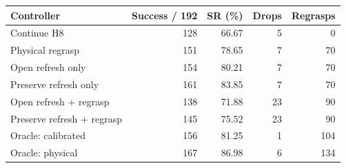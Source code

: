 \begin{tabular}{lrrrr}
\toprule
Controller & Success / 192 & SR (\%) & Drops & Regrasps \\
\midrule
Continue H8 & 128 & 66.67 & 5 & 0 \\
Physical regrasp & 151 & 78.65 & 7 & 70 \\
Open refresh only & 154 & 80.21 & 7 & 70 \\
Preserve refresh only & 161 & 83.85 & 7 & 70 \\
Open refresh + regrasp & 138 & 71.88 & 23 & 90 \\
Preserve refresh + regrasp & 145 & 75.52 & 23 & 90 \\
Oracle: calibrated & 156 & 81.25 & 1 & 104 \\
Oracle: physical & 167 & 86.98 & 6 & 134 \\
\bottomrule
\end{tabular}
